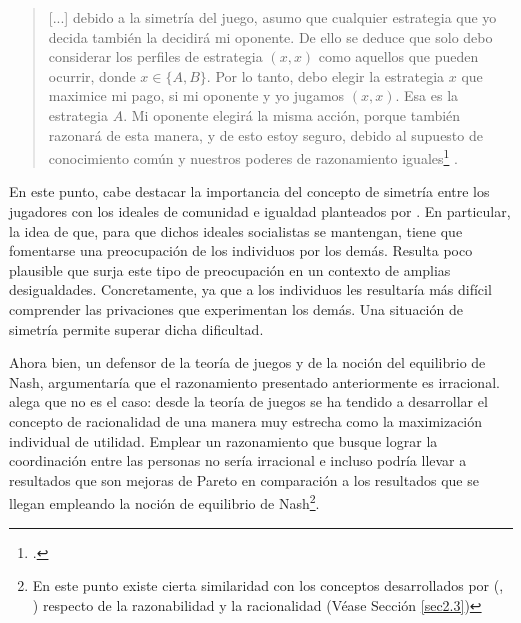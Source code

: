 \vspace{3mm}
\begin{quote}
   [...] debido a la simetría del juego, asumo que cualquier estrategia que yo decida también la decidirá mi oponente. De ello se deduce que solo debo considerar los perfiles de estrategia $(x,x)$ como aquellos que pueden ocurrir, donde $x \in \{A,B\}$. Por lo tanto, debo elegir la estrategia $x$ que maximice mi pago, si mi oponente y yo jugamos $(x,x)$. Esa es la estrategia $A$. Mi oponente elegirá la misma acción, porque también razonará de esta manera, y de esto estoy seguro, debido al supuesto de conocimiento común y nuestros poderes de razonamiento iguales\footnote{ \citep[p. 19]{Roemer_2019}.} \citep[p. 19]{Roemer_2019}.
\end{quote}
\vspace{3mm}

En este punto, cabe destacar la importancia del concepto de simetría entre los jugadores con los ideales de comunidad e igualdad planteados por \citet{Cohen_2014c}. En particular, la idea de que, para que dichos ideales socialistas se mantengan, tiene que fomentarse una preocupación de los individuos por los demás. Resulta poco plausible que surja este tipo de preocupación en un contexto de amplias desigualdades. Concretamente, ya que a los individuos les resultaría más difícil comprender las privaciones que experimentan los demás. Una situación de simetría permite superar dicha dificultad.

Ahora bien, un defensor de la teoría de juegos y de la noción del equilibrio de Nash, argumentaría que el razonamiento presentado anteriormente es irracional. \citet{Roemer_2019} alega que no es el caso: desde la teoría de juegos se ha tendido a desarrollar el concepto de racionalidad de una manera muy estrecha como la maximización individual de utilidad. Emplear un razonamiento que busque lograr la coordinación entre las personas no sería irracional e incluso podría llevar a resultados que son mejoras de Pareto en comparación a los resultados que se llegan empleando la noción de equilibrio de Nash\footnote{En este punto existe cierta similaridad con los conceptos desarrollados por \citeauthor{Rawls_1971} (\citeyear{Rawls_1971}, \citeyear{Rawls_2002}) respecto de la razonabilidad y la racionalidad (Véase Sección \ref{sec2.3})}.




